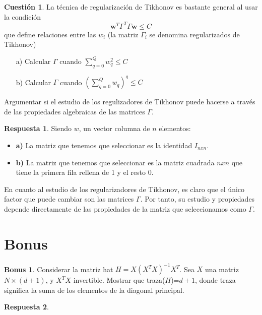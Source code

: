 \documentclass[10pt,a4paper]{article}
\theoremstyle{definition}
\newtheorem{cuestion}{Cuestión}
\newtheorem*{bonus}{Bonus}
\newtheorem*{respuesta}{Respuesta}
\begin{document}
\begin{cuestion}
La técnica de regularización de Tikhonov es bastante general al usar la condición
\[		\mathbf{w}^T\Gamma^T\Gamma\mathbf{w} \leq C		\]
que define relaciones entre las $w_i$ (la matriz $\Gamma_i$ se denomina regularizados de Tikhonov)
\begin{enumerate}
\item[a)] Calcular $\Gamma$ cuando $\sum_{q=0}^Qw_q^2 \leq C$
\item[b)] Calcular $\Gamma$ cuando $(\sum_{q=0}^Qw_q)^q \leq C$
\end{enumerate}
Argumentar si el estudio de los regulizadores de Tikhonov puede hacerse a través de las propiedades algebraicas de las matrices $\Gamma$.
\end{cuestion}
\begin{respuesta}
Siendo $w$, un vector columna de $n$ elementos:
\begin{itemize}
\item \textbf{a)} La matriz que tenemos que seleccionar es la identidad $I_{nxn}$.
\item \textbf{b)} La matriz que tenemos que seleccionar es la matriz cuadrada $nxn$ que tiene la primera fila rellena de 1 y el resto 0.
\end{itemize}

En cuanto al estudio de los regularizadores de Tikhonov, es claro que el único factor que puede cambiar son las matrices $\Gamma$. Por tanto, su estudio y propiedades depende directamente de las propiedades de la matriz que seleccionamos como $\Gamma$.\\
\end{respuesta}
\section*{Bonus}
\begin{bonus}
Considerar la matriz hat $H=X(X^TX)^{-1}X^T$. Sea $X$ una matriz $N \times (d+1)$, y $X^TX$ invertible. Mostrar que traza($H$)=$d+1$, donde traza significa la suma de los elementos de la diagonal principal.
\end{bonus}
\begin{respuesta}
\end{respuesta}
\end{document}
